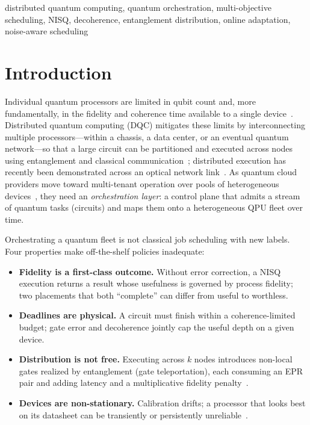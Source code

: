 \documentclass[conference]{IEEEtran}
\begin{document}
\begin{IEEEkeywords}
distributed quantum computing, quantum orchestration, multi-objective scheduling,
NISQ, decoherence, entanglement distribution, online adaptation, noise-aware
scheduling
\end{IEEEkeywords}

\section{Introduction}
Individual quantum processors are limited in qubit count and, more
fundamentally, in the fidelity and coherence time available to a single
device~\cite{barral2025review}. Distributed quantum computing (DQC) mitigates
these limits by interconnecting multiple processors---within a chassis, a data
center, or an eventual quantum network---so that a large circuit can be
partitioned and executed across nodes using entanglement and classical
communication~\cite{caleffi2024survey,chehimi2022qin}; distributed execution has
recently been demonstrated across an optical network
link~\cite{main2025optical}. As quantum cloud
providers move toward multi-tenant operation over pools of heterogeneous
devices~\cite{nguyen2024drlq}, they need an \emph{orchestration layer}: a
control plane that admits a stream of quantum tasks (circuits) and maps them onto
a heterogeneous QPU fleet over time.

Orchestrating a quantum fleet is not classical job scheduling with new labels.
Four properties make off-the-shelf policies inadequate:

\begin{itemize}
\item \textbf{Fidelity is a first-class outcome.} Without error correction, a
NISQ execution returns a result whose usefulness is governed by process fidelity;
two placements that both ``complete'' can differ from useful to worthless.
\item \textbf{Deadlines are physical.} A circuit must finish within a
coherence-limited budget; gate error and decoherence jointly cap the useful depth
on a given device.
\item \textbf{Distribution is not free.} Executing across $k$ nodes introduces
non-local gates realized by entanglement (gate teleportation), each consuming an
EPR pair and adding latency and a multiplicative fidelity
penalty~\cite{piveteau2024knitting,du2024cutting}.
\item \textbf{Devices are non-stationary.} Calibration drifts; a processor that
looks best on its datasheet can be transiently or persistently
unreliable~\cite{nguyen2025qfor}.
\end{itemize}
\end{document}
